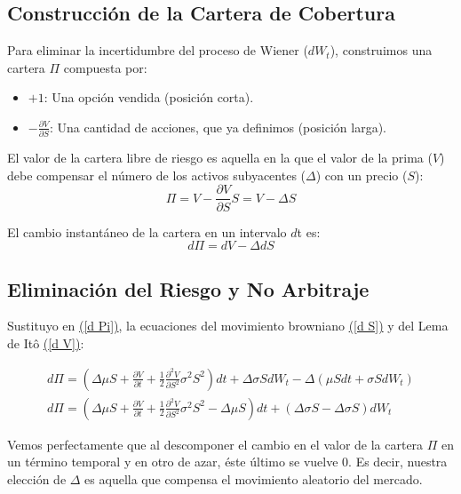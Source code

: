 \documentclass[11pt]{article}
\begin{document}
		\subsection{Construcción de la Cartera de Cobertura}
			Para eliminar la incertidumbre del proceso de Wiener ($dW_t$), construimos una cartera $\Pi$ compuesta por:
			\begin{itemize}
				\item $+1$: Una opción vendida (posición corta).
				\item $-\frac{\partial V}{\partial S}$: Una cantidad de acciones, que ya definimos (posición larga).
			\end{itemize}
			
			El valor de la cartera libre de riesgo es aquella en la que el valor de la prima ($V$) debe compensar el número de los activos subyacentes ($\Delta$) con un precio ($S$):
			\begin{equation*}
				\Pi = V - \frac{\partial V}{\partial S} S = V - \Delta S
			\end{equation*}
			
			El cambio instantáneo de la cartera en un intervalo $d$t es:
			\begin{equation}
				d\Pi = d V - \Delta dS
				\label{d Pi}
			\end{equation}
			
		\subsection{Eliminación del Riesgo y No Arbitraje}
			Sustituyo en \hyperref[d Pi]{(\ref{d Pi})}, la ecuaciones del movimiento browniano \hyperref[d S]{(\ref{d S})} y del Lema de Itô \hyperref[d V]{(\ref{d V})}:
			
			\begin{gather*}
				d\Pi = \left( \Delta\mu S + \frac{\partial V}{\partial t} + \frac{1}{2} \frac{\partial^2 V}{\partial S^2} \sigma^2 S^2 \right) dt + \Delta \sigma S dW_t - \Delta\left( \mu S dt + \sigma S dW_t \right) 
				\\
				d\Pi = \left( \Delta\mu S + \frac{\partial V}{\partial t} + \frac{1}{2} \frac{\partial^2 V}{\partial S^2} \sigma^2 S^2 - \Delta\mu S \right) dt  + \left(\Delta\sigma S - \Delta\sigma S \right)dW_t
			\end{gather*}
			
			Vemos perfectamente que al descomponer el cambio en el valor de la cartera $\Pi$ en un término temporal y en otro de azar, éste último se vuelve 0. Es decir, nuestra elección de $\Delta$ es aquella que compensa el movimiento aleatorio del mercado.
			
\end{document}
